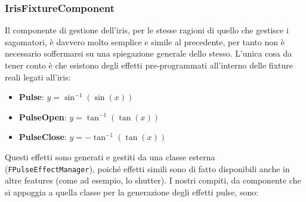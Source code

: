 \documentclass[main.tex]{subfiles}
\begin{document}
\subsubsection{IrisFixtureComponent}\label{subsec:5_1_IrisFixtureComponent}
Il componente di gestione dell'iris, per le stesse ragioni di quello che gestisce i sagomatori, è davvero molto semplice e simile al precedente, per tanto non è necessario soffermarsi su una spiegazione generale dello stesso. L'unica cosa da tener conto è che esistono degli effetti pre-programmati all'interno delle fixture reali legati all'iris:
\begin{itemize}
    \item \textbf{Pulse}: $y = \sin^{-1}(\sin(x))$
    \item \textbf{PulseOpen}: $y = \tan^{-1}(\tan(x))$
    \item \textbf{PulseClose}: $y = -\tan^{-1}(\tan(x))$
\end{itemize}
Questi effetti sono generati e gestiti da una classe esterna (\lstinline{FPulseEffectManager}), poiché effetti simili sono di fatto disponibili anche in altre features (come ad esempio, lo shutter). I nostri compiti, da componente che si appoggia a quella classe per la generazione degli effetti pulse, sono:
\end{document}
